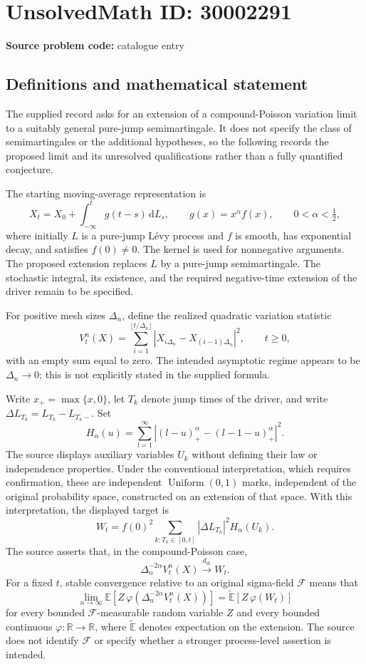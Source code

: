 \documentclass[11pt]{article}
\newcommand{\R}{\mathbb{R}}
\newcommand{\E}{\mathbb{E}}
\begin{document}
\section*{UnsolvedMath ID: 30002291}
\textbf{Source problem code:} catalogue entry
\subsection{Definitions and mathematical statement}
The supplied record asks for an extension of a compound-Poisson variation limit to a suitably general pure-jump semimartingale. It does not specify the class of semimartingales or the additional hypotheses, so the following records the proposed limit and its unresolved qualifications rather than a fully quantified conjecture.

The starting moving-average representation is
\[
X_t=X_0+\int_{-\infty}^{t}g(t-s)\,\mathrm dL_s,
\qquad g(x)=x^\alpha f(x),\qquad 0<\alpha<\tfrac12,
\]
where initially \(L\) is a pure-jump L\'evy process and \(f\) is smooth, has exponential decay, and satisfies \(f(0)\ne0\). The kernel is used for nonnegative arguments. The proposed extension replaces \(L\) by a pure-jump semimartingale. The stochastic integral, its existence, and the required negative-time extension of the driver remain to be specified.

For positive mesh sizes \(\Delta_n\), define the realized quadratic variation statistic
\[
V_t^n(X)=\sum_{i=1}^{\lfloor t/\Delta_n\rfloor}
\left|X_{i\Delta_n}-X_{(i-1)\Delta_n}\right|^2,
\qquad t\ge0,
\]
with an empty sum equal to zero. The intended asymptotic regime appears to be \(\Delta_n\to0\); this is not explicitly stated in the supplied formula.

Write \(x_+=\max\{x,0\}\), let \(T_k\) denote jump times of the driver, and write \(\Delta L_{T_k}=L_{T_k}-L_{T_k-}\). Set
\[
H_\alpha(u)=\sum_{l=1}^{\infty}
\left|(l-u)_+^\alpha-(l-1-u)_+^\alpha\right|^2.
\]
The source displays auxiliary variables \(U_k\) without defining their law or independence properties. Under the conventional interpretation, which requires confirmation, these are independent \(\operatorname{Uniform}(0,1)\) marks, independent of the original probability space, constructed on an extension of that space. With this interpretation, the displayed target is
\[
W_t=f(0)^2\sum_{k:T_k\in[0,t]}
|\Delta L_{T_k}|^2H_\alpha(U_k).
\]
The source asserts that, in the compound-Poisson case,
\[
\Delta_n^{-2\alpha}V_t^n(X)
\xrightarrow{d_{\mathrm{st}}}W_t.
\]
For a fixed \(t\), stable convergence relative to an original sigma-field \(\mathcal F\) means that
\[
\lim_{n\to\infty}\E\!\left[Z\,\varphi\!\left(\Delta_n^{-2\alpha}V_t^n(X)\right)\right]
=\widetilde{\E}\!\left[Z\,\varphi(W_t)\right]
\]
for every bounded \(\mathcal F\)-measurable random variable \(Z\) and every bounded continuous \(\varphi:\R\to\R\), where \(\widetilde{\E}\) denotes expectation on the extension. The source does not identify \(\mathcal F\) or specify whether a stronger process-level assertion is intended.
\end{document}
